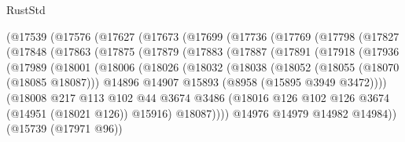 \begin{lexlean}{RustStd}
\begin{coremodule}
        (@17539
          (@17576
            (@17627
              (@17673
                (@17699
                  (@17736
                    (@17769
                      (@17798
                        (@17827
                          (@17848
                            (@17863
                              (@17875
                                (@17879
                                  (@17883
                                    (@17887
                                      (@17891
                                        (@17918
                                          (@17936
                                            (@17989
                                              (@18001
                                                (@18006
                                                  (@18026
                                                    (@18032
                                                      (@18038
                                                        (@18052
                                                          (@18055 (@18070 (@18085 @18087)))
                                                          @14896
                                                          @14907
                                                          @15893
                                                          (@8958 (@15895 @3949 @3472))))
                                                      (@18008
                                                        @217
                                                        @113
                                                        @102
                                                        @44
                                                        @3674
                                                        @3486
                                                        (@18016
                                                          @126
                                                          @102
                                                          @126
                                                          @3674
                                                          (@14951 (@18021 @126))
                                                          @15916)
                                                        @18087))))
                                                @14976
                                                @14979
                                                @14982
                                                @14984))
                                            (@15739 (@17971 @96))

\end{coremodule}
\end{lexlean}
